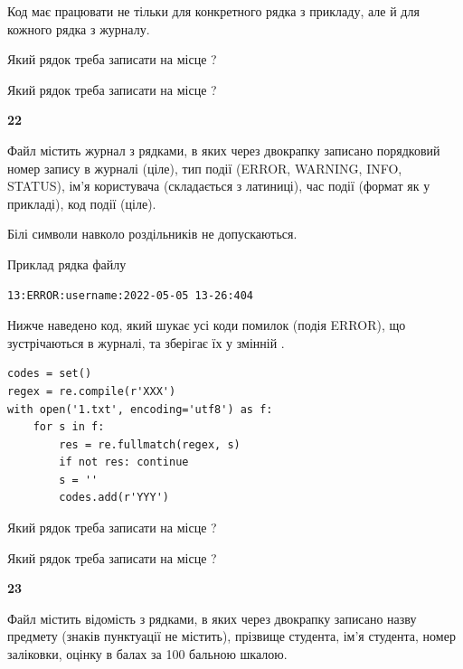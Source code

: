 Код має працювати не тільки для конкретного рядка з прикладу, але й для кожного рядка з журналу.




Який рядок треба записати на місце  ?\par
\vspace{5mm}


Який рядок треба записати на місце  ?\par


\newpage

{\begin {center}\textbf{ 22}\end {center}}\par
Файл  містить журнал з рядками, в яких через двокрапку записано поряд\-ко\-вий номер запису в журналі (ціле), тип події (ERROR, WARNING, INFO, STATUS), ім'я користувача (складається з латиниці), час події (фор\-мат як у прикладі), код події (ціле).

Білі символи навколо роздільників не допускаються.

Приклад рядка файлу



\begin{verbatim}
13:ERROR:username:2022-05-05 13-26:404
\end{verbatim}


Нижче наведено код, який шукає усі коди помилок (подія ERROR), що зустріча\-ють\-ся в журналі, та зберігає їх у змінній .



\begin{verbatim}
codes = set()
regex = re.compile(r'XXX')
with open('1.txt', encoding='utf8') as f:
    for s in f:
        res = re.fullmatch(regex, s)
        if not res: continue
        s = ''
        codes.add(r'YYY')
\end{verbatim}





Який рядок треба записати на місце  ?\par
\vspace{5mm}


Який рядок треба записати на місце  ?\par


\newpage

{\begin {center}\textbf{ 23}\end {center}}\par
Файл  містить відомість з рядками, в яких через двокрапку записа\-но назву предмету (знаків пунктуації не містить), прізвище студента, ім'я студента, номер залі\-ков\-ки, оцінку в балах за 100 бальною шкалою.

